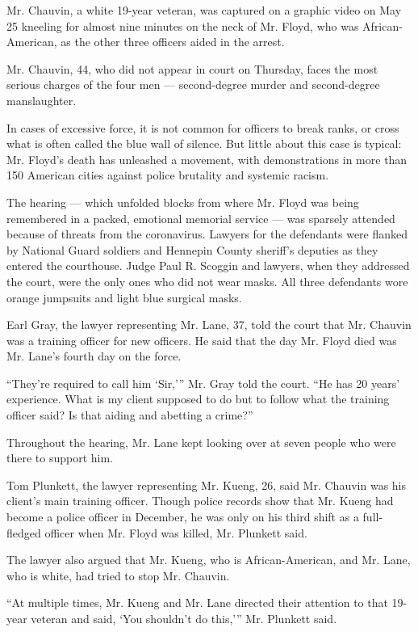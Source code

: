 Mr. Chauvin, a white 19-year veteran, was captured on a graphic video on
May 25 kneeling for almost nine minutes on the neck of Mr. Floyd, who
was African-American, as the other three officers aided in the arrest.

Mr. Chauvin, 44, who did not appear in court on Thursday, faces the most
serious charges of the four men --- second-degree murder and
second-degree manslaughter.

In cases of excessive force, it is not common for officers to break
ranks, or cross what is often called the blue wall of silence. But
little about this case is typical: Mr. Floyd's death has unleashed a
movement, with demonstrations in more than 150 American cities against
police brutality and systemic racism.

The hearing --- which unfolded blocks from where Mr. Floyd was being
remembered in a packed, emotional memorial service --- was sparsely
attended because of threats from the coronavirus. Lawyers for the
defendants were flanked by National Guard soldiers and Hennepin County
sheriff's deputies as they entered the courthouse. Judge Paul R. Scoggin
and lawyers, when they addressed the court, were the only ones who did
not wear masks. All three defendants wore orange jumpsuits and light
blue surgical masks.

Earl Gray, the lawyer representing Mr. Lane, 37, told the court that Mr.
Chauvin was a training officer for new officers. He said that the day
Mr. Floyd died was Mr. Lane's fourth day on the force.

``They're required to call him `Sir,''' Mr. Gray told the court. ``He
has 20 years' experience. What is my client supposed to do but to follow
what the training officer said? Is that aiding and abetting a crime?''

Throughout the hearing, Mr. Lane kept looking over at seven people who
were there to support him.

Tom Plunkett, the lawyer representing Mr. Kueng, 26, said Mr. Chauvin
was his client's main training officer. Though police records show that
Mr. Kueng had become a police officer in December, he was only on his
third shift as a full-fledged officer when Mr. Floyd was killed, Mr.
Plunkett said.

The lawyer also argued that Mr. Kueng, who is African-American, and Mr.
Lane, who is white, had tried to stop Mr. Chauvin.

``At multiple times, Mr. Kueng and Mr. Lane directed their attention to
that 19-year veteran and said, `You shouldn't do this,''' Mr. Plunkett
said.

